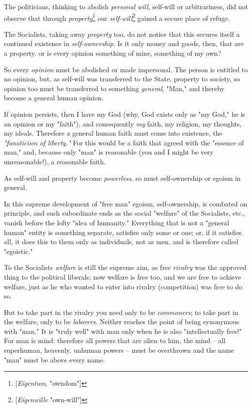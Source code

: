 The politicians, thinking to abolish \textit{personal will}, self-will or 
arbitrariness, did not observe that through 
\textit{property}\footnote{[\textit{Eigentum}, "{}owndom"{}]} our 
\textit{self-will}\footnote{[\textit{Eigenwille} "{}own-will"{}]} gained a 
secure place of refuge.

The Socialists, taking away \textit{property} too, do not notice that this 
secures itself a continued existence in \textit{self-ownership}. Is it only 
money and goods, then, that are a property. or is every opinion something of 
mine, something of my own?

So every \textit{opinion} must be abolished or made impersonal. The person is 
entitled to no opinion, but, as self-will was transferred to the State, 
property to society, so opinion too must be transferred to something 
\textit{general}, "{}Man,"{} and thereby become a general human opinion.

If opinion persists, then I have my God (why, God exists only as "{}my God,"{} 
he is an opinion or my "{}faith"{}), and consequently \textit{my} faith, my 
religion, my thoughts, my ideals. Therefore a general human faith must come 
into existence, the \textit{"{}fanaticism of liberty."{}} For this would be a 
faith that agreed with the "{}essence of man,"{} and, because only "{}man"{} 
is reasonable (you and I might be very unreasonable!), a reasonable faith.

As self-will and property become \textit{powerless}, so must self-ownership or 
egoism in general.

In this supreme development of "{}free man"{} egoism, self-ownership, is 
combated on principle, and such subordinate ends as the social "{}welfare"{} 
of the Socialists, etc., vanish before the lofty "{}idea of humanity."{} 
Everything that is not a "{}general human"{} entity is something separate, 
satisfies only some or one; or, if it satisfies all, it does this to them only 
as individuals, not as men, and is therefore called "{}egoistic."{}

To the Socialists \textit{welfare} is still the supreme aim, as free 
\textit{rivalry} was the approved thing to the political liberals; now welfare 
is free too, and we are free to achieve welfare, just as he who wanted to 
enter into rivalry (competition) was free to do so.

But to take part in the rivalry you need only to be \textit{commoners}; to 
take part in the welfare, only to be \textit{laborers}. Neither reaches the 
point of being synonymous with "{}man."{} It is "{}truly well"{} with man only 
when he is also "{}intellectually free!"{} For man is mind: therefore all 
powers that are alien to him, the mind -- all superhuman, heavenly, unhuman 
powers -- must be overthrown and the name "{}man"{} must be above every name.

